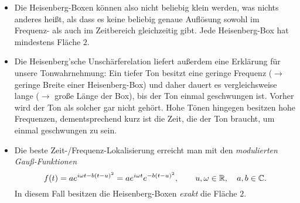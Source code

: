 \begin{remark} \leavevmode
\begin{itemize}
\item Die Heisenberg-Boxen können also nicht beliebig klein werden, was nichts anderes heißt, als
  dass es keine beliebig genaue Auflösung sowohl im Frequenz- als auch im Zeitbereich gleichzeitig
  gibt. Jede Heisenberg-Box hat mindestens Fläche $ 2 $.
\item Die Heisenberg'sche Unschärferelation liefert außerdem eine Erklärung für unsere 
  Tonwahrnehmung: Ein tiefer Ton besitzt eine geringe Frequenz ($ \rightarrow $ geringe Breite 
  einer Heisenberg-Box) und daher dauert es vergleichsweise lange ($ \rightarrow $ große Länge der 
  Box), bis der Ton einmal geschwungen ist. Vorher wird der Ton als solcher gar nicht gehört.
  Hohe Tönen hingegen besitzen hohe Frequenzen, dementsprechend kurz ist die Zeit, die der Ton
  braucht, um einmal geschwungen zu sein.
\item Die beste Zeit-/Frequenz-Lokalisierung erreicht man mit den \emph{modulierten Gauß-Funktionen}
  \[
    f(t) = a e^{i \omega t - b(t-u)^{2}} = a e^{i \omega t} e^{-b(t-u)^{2}},
      \qquad u, \omega \in \mathbb{R}, \quad a,b \in \mathbb{C}.
  \]
  In diesem Fall besitzen die Heisenberg-Boxen \emph{exakt} die Fläche $ 2 $.
\end{itemize}
\end{remark}